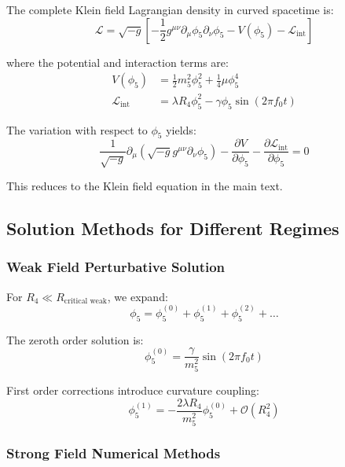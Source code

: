 \documentclass[12pt]{iopart}
\begin{document}
The complete Klein field Lagrangian density in curved spacetime is:
\begin{equation}
\mathcal{L} = \sqrt{-g}\left[-\frac{1}{2}g^{\mu\nu}\partial_\mu\phi_5\partial_\nu\phi_5 - V(\phi_5) - \mathcal{L}_{\text{int}}\right]
\end{equation}

where the potential and interaction terms are:
\begin{align}
V(\phi_5) &= \frac{1}{2}m_5^2\phi_5^2 + \frac{1}{4}\mu\phi_5^4\\
\mathcal{L}_{\text{int}} &= \lambda R_4\phi_5^2 - \gamma\phi_5\sin(2\pi f_0 t)
\end{align}

The variation with respect to $\phi_5$ yields:
\begin{equation}
\frac{1}{\sqrt{-g}}\partial_\mu(\sqrt{-g}g^{\mu\nu}\partial_\nu\phi_5) - \frac{\partial V}{\partial\phi_5} - \frac{\partial\mathcal{L}_{\text{int}}}{\partial\phi_5} = 0
\end{equation}

This reduces to the Klein field equation in the main text.

\subsection{Solution Methods for Different Regimes}

\subsubsection{Weak Field Perturbative Solution}

For $R_4 \ll R_{\text{critical weak}}$, we expand:
\begin{equation}
\phi_5 = \phi_5^{(0)} + \phi_5^{(1)} + \phi_5^{(2)} + \ldots
\end{equation}

The zeroth order solution is:
\begin{equation}
\phi_5^{(0)} = \frac{\gamma}{m_5^2}\sin(2\pi f_0 t)
\end{equation}

First order corrections introduce curvature coupling:
\begin{equation}
\phi_5^{(1)} = -\frac{2\lambda R_4}{m_5^2}\phi_5^{(0)} + \mathcal{O}(R_4^2)
\end{equation}

\subsubsection{Strong Field Numerical Methods}
\end{document}
